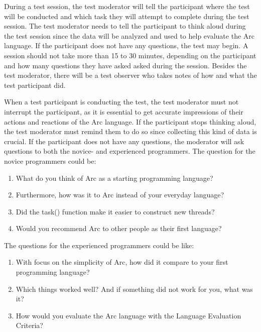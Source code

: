 During a test session, the test moderator will tell the participant where the test will be conducted and which task they will attempt to complete during the test session. The test moderator needs to tell the participant to think aloud during the test session since the data will be analyzed and used to help evaluate the Arc language. If the participant does not have any questions, the test may begin. A session should not take more than 15 to 30 minutes, depending on the participant and how many questions they have asked asked during the session. Besides the test moderator, there will be a test observer who takes notes of how and what the test participant did.

When a test participant is conducting the test, the test moderator must not interrupt the participant, as it is essential to get accurate impressions of their actions and reactions of the Arc language. If the participant stops thinking aloud, the test moderator must remind them to do so since collecting this kind of data is crucial. If the participant does not have any questions, the moderator will ask questions to both the novice- and experienced programmers. The question for the novice programmers could be:
\begin{enumerate}
    \item What do you think of Arc as a starting programming language?
    \item Furthermore, how was it to Arc instead of your everyday language?
    \item Did the task() function make it easier to construct new threads?
    \item Would you recommend Arc to other people as their first language?
\end{enumerate}

The questions for the experienced programmers could be like:
\begin{enumerate}
    \item With focus on the simplicity of Arc, how did it compare to your first programming language?
    \item Which things worked well? And if something did not work for you, what was it?
    \item How would you evaluate the Arc language with the Language Evaluation Criteria?
\end{enumerate}

